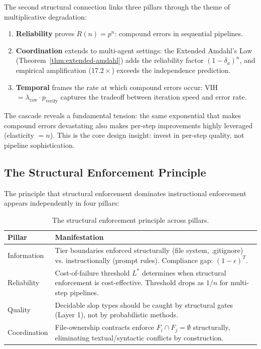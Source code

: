 The second structural connection links three pillars through the theme of multiplicative degradation:

\begin{enumerate}
    \item \textbf{Reliability} proves $R(n) = p^n$: compound errors in sequential pipelines.
    \item \textbf{Coordination} extends to multi-agent settings: the Extended Amdahl's Law (Theorem~\ref{thm:extended-amdahl}) adds the reliability factor $(1-\delta_a)^n$, and empirical amplification ($17.2\times$) exceeds the independence prediction.
    \item \textbf{Temporal} frames the rate at which compound errors occur: VIH $= \lambda_{\text{raw}} \cdot p_{\text{verify}}$ captures the tradeoff between iteration speed and error rate.
\end{enumerate}

The cascade reveals a fundamental tension: the same exponential that makes compound errors devastating also makes per-step improvements highly leveraged (elasticity $= n$). This is the core design insight: invest in per-step quality, not pipeline sophistication.

\subsection{The Structural Enforcement Principle}

The principle that structural enforcement dominates instructional enforcement appears independently in four pillars:

\begin{table}[h]
\centering
\caption{The structural enforcement principle across pillars.}
\label{tab:structural}
\begin{tabular}{lp{10cm}}
\toprule
\textbf{Pillar} & \textbf{Manifestation} \\
\midrule
Information & Tier boundaries enforced structurally (file system, .gitignore) vs. instructionally (prompt rules). Compliance gap: $(1-\epsilon)^T$. \\
Reliability & Cost-of-failure threshold $L^*$ determines when structural enforcement is cost-effective. Threshold drops as $1/n$ for multi-step pipelines. \\
Quality & Decidable slop types should be caught by structural gates (Layer 1), not by probabilistic methods. \\
Coordination & File-ownership contracts enforce $F_i \cap F_j = \emptyset$ structurally, eliminating textual/syntactic conflicts by construction. \\
\bottomrule
\end{tabular}
\end{table}


